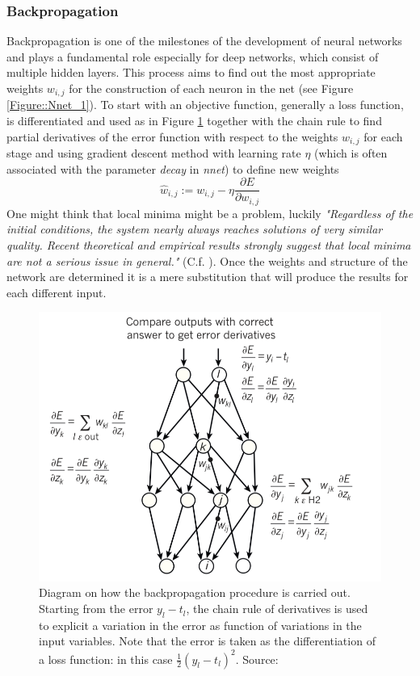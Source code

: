 \documentclass[a4paper,12pt]{article}
\begin{document}
\subsubsection{Backpropagation}
Backpropagation is one of the milestones of the development of neural networks and plays a fundamental role especially for deep networks, which consist of multiple hidden layers.
This process aims to find out the most appropriate weights $w_{i,j}$ for the construction of each neuron in the net (see Figure \ref{Figure::Nnet_1}).
To start with an objective function, generally a loss function, is differentiated and used as in Figure \ref{Figure::Nnet_2} together with the chain rule to find partial derivatives of the error function with respect to the weights $w_{i,j}$ for each stage and using gradient descent method with learning rate $\eta$ (which is often associated with the parameter \textit{decay} in \textit{nnet}) to define new weights $$\hat{w}_{i,j}:=w_{i,j}- \eta \frac{\partial E}{\partial w_{i,j}}$$
One might think that local minima might be a problem, luckily \textit{"Regardless of the initial conditions, the system nearly always reaches solutions of very similar quality. Recent theoretical and empirical results strongly suggest that local minima are not a serious issue in general."} (C.f. \cite{lecun2015}).
Once the weights and structure of the network are determined it is a mere substitution that will produce the results for each different input.
\begin{figure}
  \begin{minipage}[c]{0.65\textwidth}
    \includegraphics[width=\textwidth]{pictures/nnet_2.png}
  \end{minipage}\hfill
  \begin{minipage}[c]{0.35\textwidth}
    \caption{Diagram on how the backpropagation procedure is carried out. Starting from the error $y_{l}-t_{l}$, the chain rule of derivatives is used to explicit a variation in the error as function of variations in the input variables. Note that the error is taken as the differentiation of a loss function: in this case $\frac{1}{2} (y_{l}-t_{l})^{2}$. Source: \cite{lecun2015}}
    \label{Figure::Nnet_2}
  \end{minipage}
\end{figure}
\end{document}
